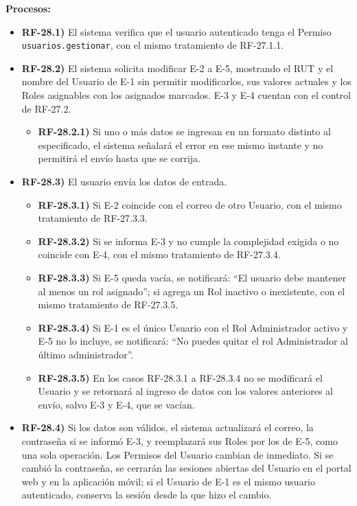 \textbf{Procesos:}
\begin{itemize}[label={}, leftmargin=1.5em]
  \item \textbf{RF-28.1)} El sistema verifica que el usuario autenticado tenga el Permiso \texttt{usuarios.gestionar}, con el mismo tratamiento de RF-27.1.1.
  \item \textbf{RF-28.2)} El sistema solicita modificar E-2 a E-5, mostrando el RUT y el nombre del Usuario de E-1 sin permitir modificarlos, sus valores actuales y los Roles asignables con los asignados marcados. E-3 y E-4 cuentan con el control de RF-27.2.
  \begin{itemize}[label={}, leftmargin=1.5em]
    \item \textbf{RF-28.2.1)} Si uno o m\'as datos se ingresan en un formato distinto al especificado, el sistema se\~nalar\'a el error en ese mismo instante y no permitir\'a el env\'io hasta que se corrija.
  \end{itemize}
  \item \textbf{RF-28.3)} El usuario env\'ia los datos de entrada.
  \begin{itemize}[label={}, leftmargin=1.5em]
    \item \textbf{RF-28.3.1)} Si E-2 coincide con el correo de otro Usuario, con el mismo tratamiento de RF-27.3.3.
    \item \textbf{RF-28.3.2)} Si se informa E-3 y no cumple la complejidad exigida o no coincide con E-4, con el mismo tratamiento de RF-27.3.4.
    \item \textbf{RF-28.3.3)} Si E-5 queda vac\'ia, se notificar\'a: ``El usuario debe mantener al menos un rol asignado''; si agrega un Rol inactivo o inexistente, con el mismo tratamiento de RF-27.3.5.
    \item \textbf{RF-28.3.4)} Si E-1 es el \'unico Usuario con el Rol Administrador activo y E-5 no lo incluye, se notificar\'a: ``No puedes quitar el rol Administrador al \'ultimo administrador''.
    \item \textbf{RF-28.3.5)} En los casos RF-28.3.1 a RF-28.3.4 no se modificar\'a el Usuario y se retornar\'a al ingreso de datos con los valores anteriores al env\'io, salvo E-3 y E-4, que se vac\'ian.
  \end{itemize}
  \item \textbf{RF-28.4)} Si los datos son v\'alidos, el sistema actualizar\'a el correo, la contrase\~na si se inform\'o E-3, y reemplazar\'a sus Roles por los de E-5, como una sola operaci\'on. Los Permisos del Usuario cambian de inmediato. Si se cambi\'o la contrase\~na, se cerrar\'an las sesiones abiertas del Usuario en el portal web y en la aplicaci\'on m\'ovil; si el Usuario de E-1 es el mismo usuario autenticado, conserva la sesi\'on desde la que hizo el cambio.

\end{itemize}
